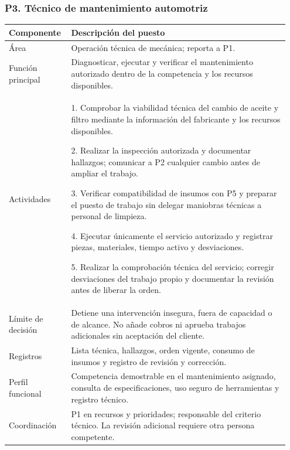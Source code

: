{\par\medskip\noindent\begin{minipage}{\linewidth}\subsubsection*{P3. Técnico de mantenimiento automotriz}
{\small\renewcommand{\arraystretch}{1.15}\begin{tabular}{@{}p{0.20\linewidth}p{0.75\linewidth}@{}}\toprule
\textbf{Componente} & \textbf{Descripción del puesto} \\ \midrule
Área & Operación técnica de mecánica; reporta a P1. \\ \midrule
Función principal & Diagnosticar, ejecutar y verificar el mantenimiento autorizado dentro de la competencia y los recursos disponibles. \\ \midrule
Actividades & 1. Comprobar la viabilidad técnica del cambio de aceite y filtro mediante la información del fabricante y los recursos disponibles.\par 2. Realizar la inspección autorizada y documentar hallazgos; comunicar a P2 cualquier cambio antes de ampliar el trabajo.\par 3. Verificar compatibilidad de insumos con P5 y preparar el puesto de trabajo sin delegar maniobras técnicas a personal de limpieza.\par 4. Ejecutar únicamente el servicio autorizado y registrar piezas, materiales, tiempo activo y desviaciones.\par 5. Realizar la comprobación técnica del servicio; corregir desviaciones del trabajo propio y documentar la revisión antes de liberar la orden. \\ \midrule
Límite de decisión & Detiene una intervención insegura, fuera de capacidad o de alcance. No añade cobros ni aprueba trabajos adicionales sin aceptación del cliente. \\ \midrule
Registros & Lista técnica, hallazgos, orden vigente, consumo de insumos y registro de revisión y corrección. \\ \midrule
Perfil funcional & Competencia demostrable en el mantenimiento asignado, consulta de especificaciones, uso seguro de herramientas y registro técnico. \\ \midrule
Coordinación & P1 en recursos y prioridades; responsable del criterio técnico. La revisión adicional requiere otra persona competente. \\ \midrule
\end{tabular}}\end{minipage}\par\medskip
}
